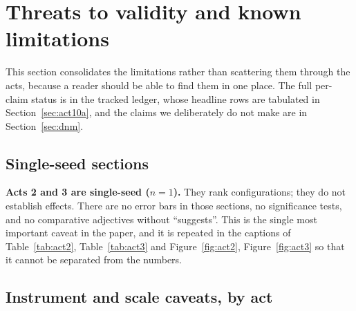 \documentclass[11pt,a4paper]{article}
\begin{document}
\section{Threats to validity and known limitations}
\label{sec:threats}

This section consolidates the limitations rather than scattering them through
the acts, because a reader should be able to find them in one place. The full
per-claim status is in the tracked ledger, whose headline rows are tabulated
in Section~\ref{sec:act10a}, and the claims we deliberately do not make are in
Section~\ref{sec:dnm}.

\subsection{Single-seed sections}
\label{sec:threats-n1}

\textbf{Acts 2 and 3 are single-seed ($n = 1$).} They rank configurations;
they do not establish effects. There are no error bars in those sections, no
significance tests, and no comparative adjectives without ``suggests''. This
is the single most important caveat in the paper, and it is repeated in the
captions of Table~\ref{tab:act2}, Table~\ref{tab:act3} and
Figure~\ref{fig:act2}, Figure~\ref{fig:act3} so that it cannot be separated
from the numbers.

\subsection{Instrument and scale caveats, by act}
\label{sec:threats-instrument}
\end{document}
